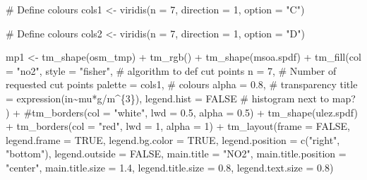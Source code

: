\documentclass[
  letterpaper,
]{scrbook}
\newenvironment{Shaded}{\begin{snugshade}}{\end{snugshade}}
\newcommand{\AttributeTok}[1]{\textcolor[rgb]{0.40,0.45,0.13}{#1}}
\newcommand{\CommentTok}[1]{\textcolor[rgb]{0.37,0.37,0.37}{#1}}
\newcommand{\ConstantTok}[1]{\textcolor[rgb]{0.56,0.35,0.01}{#1}}
\newcommand{\DecValTok}[1]{\textcolor[rgb]{0.68,0.00,0.00}{#1}}
\newcommand{\FloatTok}[1]{\textcolor[rgb]{0.68,0.00,0.00}{#1}}
\newcommand{\FunctionTok}[1]{\textcolor[rgb]{0.28,0.35,0.67}{#1}}
\newcommand{\NormalTok}[1]{\textcolor[rgb]{0.00,0.23,0.31}{#1}}
\newcommand{\OtherTok}[1]{\textcolor[rgb]{0.00,0.23,0.31}{#1}}
\newcommand{\SpecialCharTok}[1]{\textcolor[rgb]{0.37,0.37,0.37}{#1}}
\newcommand{\StringTok}[1]{\textcolor[rgb]{0.13,0.47,0.30}{#1}}
\begin{document}
\begin{Shaded}
\begin{Highlighting}[]
\CommentTok{\# Define colours}
\NormalTok{cols1 }\OtherTok{\textless{}{-}} \FunctionTok{viridis}\NormalTok{(}\AttributeTok{n =} \DecValTok{7}\NormalTok{, }\AttributeTok{direction =} \DecValTok{1}\NormalTok{, }\AttributeTok{option =} \StringTok{"C"}\NormalTok{)}

\CommentTok{\# Define colours}
\NormalTok{cols2 }\OtherTok{\textless{}{-}} \FunctionTok{viridis}\NormalTok{(}\AttributeTok{n =} \DecValTok{7}\NormalTok{, }\AttributeTok{direction =} \DecValTok{1}\NormalTok{, }\AttributeTok{option =} \StringTok{"D"}\NormalTok{)}

\NormalTok{mp1 }\OtherTok{\textless{}{-}}  \FunctionTok{tm\_shape}\NormalTok{(osm\_tmp) }\SpecialCharTok{+} \FunctionTok{tm\_rgb}\NormalTok{() }\SpecialCharTok{+}
  \FunctionTok{tm\_shape}\NormalTok{(msoa.spdf) }\SpecialCharTok{+} 
  \FunctionTok{tm\_fill}\NormalTok{(}\AttributeTok{col =} \StringTok{"no2"}\NormalTok{, }
          \AttributeTok{style =} \StringTok{"fisher"}\NormalTok{, }\CommentTok{\# algorithm to def cut points}
          \AttributeTok{n =} \DecValTok{7}\NormalTok{, }\CommentTok{\# Number of requested cut points}
          \AttributeTok{palette =}\NormalTok{ cols1, }\CommentTok{\# colours}
          \AttributeTok{alpha =} \FloatTok{0.8}\NormalTok{, }\CommentTok{\# transparency }
          \AttributeTok{title =} \FunctionTok{expression}\NormalTok{(}\StringTok{\textquotesingle{}in\textquotesingle{}}\SpecialCharTok{\textasciitilde{}}\NormalTok{mu}\SpecialCharTok{*}\StringTok{\textquotesingle{}g\textquotesingle{}}\SpecialCharTok{/}\NormalTok{m}\SpecialCharTok{\^{}}\NormalTok{\{}\DecValTok{3}\NormalTok{\}), }
          \AttributeTok{legend.hist =} \ConstantTok{FALSE} \CommentTok{\# histogram next to map?}
\NormalTok{          ) }\SpecialCharTok{+}
  \CommentTok{\#tm\_borders(col = "white", lwd = 0.5, alpha = 0.5) +}
  \FunctionTok{tm\_shape}\NormalTok{(ulez.spdf) }\SpecialCharTok{+}
  \FunctionTok{tm\_borders}\NormalTok{(}\AttributeTok{col =} \StringTok{"red"}\NormalTok{, }\AttributeTok{lwd =} \DecValTok{1}\NormalTok{, }\AttributeTok{alpha =} \DecValTok{1}\NormalTok{) }\SpecialCharTok{+}
  \FunctionTok{tm\_layout}\NormalTok{(}\AttributeTok{frame =} \ConstantTok{FALSE}\NormalTok{,}
            \AttributeTok{legend.frame =} \ConstantTok{TRUE}\NormalTok{, }\AttributeTok{legend.bg.color =} \ConstantTok{TRUE}\NormalTok{,}
            \AttributeTok{legend.position =} \FunctionTok{c}\NormalTok{(}\StringTok{"right"}\NormalTok{, }\StringTok{"bottom"}\NormalTok{),}
            \AttributeTok{legend.outside =} \ConstantTok{FALSE}\NormalTok{,}
            \AttributeTok{main.title =} \StringTok{"NO2"}\NormalTok{, }
            \AttributeTok{main.title.position =} \StringTok{"center"}\NormalTok{,}
            \AttributeTok{main.title.size =} \FloatTok{1.4}\NormalTok{,}
            \AttributeTok{legend.title.size =} \FloatTok{0.8}\NormalTok{,}
            \AttributeTok{legend.text.size =} \FloatTok{0.8}\NormalTok{)}


\end{Highlighting}
\end{Shaded}
\end{document}

